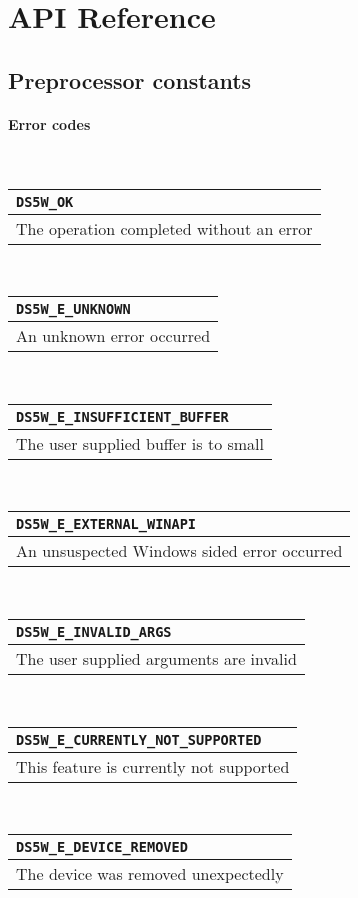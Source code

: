 \section{API Reference}
\subsection{Preprocessor constants}


\newcommand{\tblx}[2]{
	\noindent
	\begin{tabularx}{\textwidth} { | >{\raggedright\arraybackslash}X |  }
		\hline
		\texttt{#1} \\
		\hline
		#2 \\
		\hline
	\end{tabularx}
	\mbox{}\\

}

\newcommand{\tbly}[3]{
	\noindent
	\begin{tabularx}{\textwidth}{|s|b|}
		\hline
			#1 & \texttt{#2} \\
		\hline
			\multicolumn{2}{|l|}{\begin{minipage}{0.9\linewidth} #3 \end{minipage}} \\
		\hline
	\end{tabularx}
	\mbox{}
}

\paragraph{Error codes}
\mbox{}\\

\tblx{DS5W\_OK}{The operation completed without an error}

\tblx{DS5W\_E\_UNKNOWN}{An unknown error occurred}

\tblx{DS5W\_E\_INSUFFICIENT\_BUFFER}{The user supplied buffer is to small }

\tblx{DS5W\_E\_EXTERNAL\_WINAPI}{An unsuspected Windows sided error occurred}

\tblx{DS5W\_E\_INVALID\_ARGS}{The user supplied arguments are invalid}

\tblx{DS5W\_E\_CURRENTLY\_NOT\_SUPPORTED}{This feature is currently not supported}

\tblx{DS5W\_E\_DEVICE\_REMOVED}{The device was removed unexpectedly}

